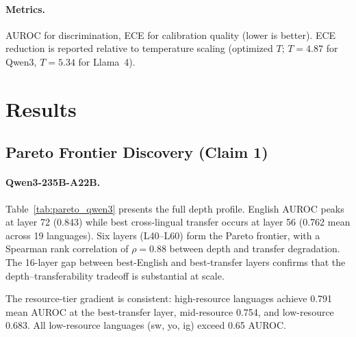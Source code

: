 \documentclass[11pt,a4paper]{article}
\begin{document}
\paragraph{Metrics.} AUROC for discrimination, ECE for calibration quality (lower is better). ECE reduction is reported relative to temperature scaling (optimized $T$; $T=4.87$ for Qwen3, $T=5.34$ for Llama~4).

\section{Results}
\label{sec:results}

\subsection{Pareto Frontier Discovery (Claim 1)}
\label{sec:res_pareto}

\paragraph{Qwen3-235B-A22B.}
Table~\ref{tab:pareto_qwen3} presents the full depth profile. English AUROC peaks at layer 72 (0.843) while best cross-lingual transfer occurs at layer 56 (0.762 mean across 19 languages). Six layers (L40--L60) form the Pareto frontier, with a Spearman rank correlation of $\rho=0.88$ between depth and transfer degradation. The 16-layer gap between best-English and best-transfer layers confirms that the depth--transferability tradeoff is substantial at scale.

The resource-tier gradient is consistent: high-resource languages achieve 0.791 mean AUROC at the best-transfer layer, mid-resource 0.754, and low-resource 0.683. All low-resource languages (sw, yo, ig) exceed 0.65 AUROC.
\end{document}
